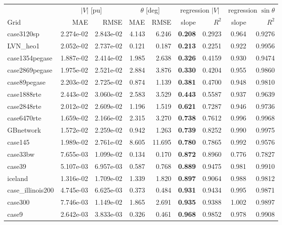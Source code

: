 \documentclass[10pt]{article}
\begin{document}
\begin{table}[H]
\centering
\small
\begin{tabular}{lrrrrrrrr}
\toprule
 & \multicolumn{2}{c}{$|V|$ [pu]} & \multicolumn{2}{c}{$\theta$ [deg]} & \multicolumn{2}{c}{regression $|V|$} & \multicolumn{2}{c}{regression $\sin\theta$} \\
\cmidrule(lr){2-3}\cmidrule(lr){4-5}\cmidrule(lr){6-7}\cmidrule(lr){8-9}
Grid & MAE & RMSE & MAE & RMSE & slope & $R^2$ & slope & $R^2$ \\
\midrule
case3120sp & 2.274e-02 & 2.843e-02 & 4.143 & 6.246 & \textbf{0.208} & 0.2923 & 0.964 & 0.9276 \\
LVN\_heo1 & 2.052e-02 & 2.737e-02 & 0.121 & 0.187 & \textbf{0.213} & 0.2251 & 0.922 & 0.9956 \\
case1354pegase & 1.887e-02 & 2.414e-02 & 1.985 & 2.638 & \textbf{0.326} & 0.4159 & 0.930 & 0.9474 \\
case2869pegase & 1.975e-02 & 2.521e-02 & 2.884 & 3.876 & \textbf{0.330} & 0.4204 & 0.955 & 0.9860 \\
case89pegase & 2.203e-02 & 2.725e-02 & 0.874 & 1.139 & \textbf{0.381} & 0.4700 & 0.948 & 0.9810 \\
case1888rte & 2.443e-02 & 3.060e-02 & 2.583 & 3.529 & \textbf{0.443} & 0.5587 & 0.937 & 0.9639 \\
case2848rte & 2.012e-02 & 2.609e-02 & 1.196 & 1.519 & \textbf{0.621} & 0.7287 & 0.946 & 0.9736 \\
case6470rte & 1.659e-02 & 2.166e-02 & 2.315 & 3.270 & \textbf{0.738} & 0.7612 & 0.996 & 0.9968 \\
GBnetwork & 1.572e-02 & 2.259e-02 & 0.942 & 1.263 & \textbf{0.739} & 0.8252 & 0.990 & 0.9975 \\
case145 & 1.989e-02 & 2.761e-02 & 8.605 & 11.695 & \textbf{0.780} & 0.7865 & 0.992 & 0.9576 \\
case33bw & 7.655e-03 & 1.099e-02 & 0.134 & 0.170 & \textbf{0.872} & 0.8960 & 0.776 & 0.7827 \\
case39 & 5.107e-03 & 6.957e-03 & 0.587 & 0.768 & \textbf{0.889} & 0.9475 & 0.981 & 0.9910 \\
iceland & 1.316e-02 & 1.709e-02 & 1.339 & 1.820 & \textbf{0.897} & 0.9064 & 0.988 & 0.9812 \\
case\_illinois200 & 4.745e-03 & 6.625e-03 & 0.373 & 0.484 & \textbf{0.931} & 0.9434 & 0.995 & 0.9871 \\
case300 & 7.746e-03 & 1.149e-02 & 1.865 & 2.691 & \textbf{0.935} & 0.9388 & 1.002 & 0.9897 \\
case9 & 2.642e-03 & 3.833e-03 & 0.326 & 0.461 & \textbf{0.968} & 0.9852 & 0.978 & 0.9908 \\

\end{tabular}
\end{table}
\end{document}
